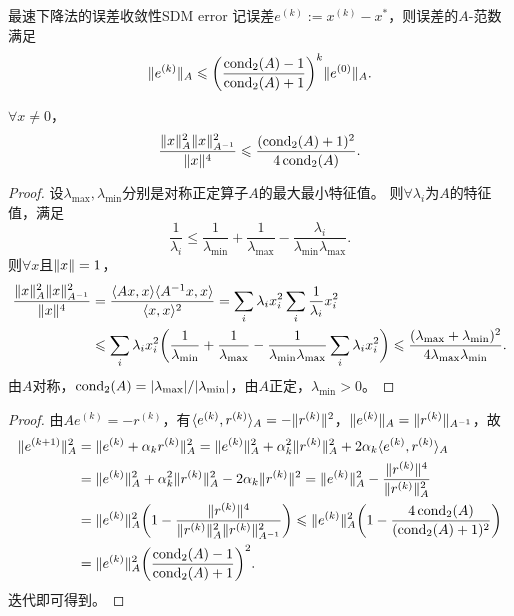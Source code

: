\begin{theorem}
    {最速下降法的误差收敛性}{SDM error}
    记误差$e^{(k)} := x^{(k)} - x^*$，则误差的$A$-范数满足
    \begin{equation}
        \label{eqn:SDM e^k}
        \lVert e^{(k)}\rVert_A \leqslant \biggl(\frac{\operatorname{cond}_2(A) - 1}{\operatorname{cond}_2(A) + 1}\biggr)^k\lVert e^{(0)}\rVert_A.
    \end{equation}
\end{theorem}

\begin{lemma}
    $\forall x \neq 0$，
    \begin{equation}
        \frac{\lVert x\rVert_A^2\lVert x\rVert_{A^{-1}}^2}{\lVert x\rVert^4} \leqslant \frac{(\operatorname{cond}_2(A) + 1)^2}{4\operatorname{cond}_2(A)}.
    \end{equation}
\end{lemma}

\begin{proof}
    设$\lambda_{\max},\lambda_{\min}$分别是对称正定算子$A$的最大最小特征值。
    则$\forall\lambda_i$为$A$的特征值，满足
    \[
        \frac1{\lambda_i} \leq \frac1{\lambda_{\min}} + \frac1{\lambda_{\max}} - \frac{\lambda_i}{\lambda_{\min}\lambda_{\max}}.
    \]
    则$\forall x$且$\lVert x\rVert = 1$，
    \begin{align*}
        \frac{\lVert x\rVert_A^2\lVert x\rVert_{A^{-1}}^2}{\lVert x\rVert^4} &= \frac{\langle Ax,x\rangle\langle A^{-1} x,x\rangle}{\langle x,x\rangle^2} = \sum_i\lambda_ix_i^2\sum_i\frac1{\lambda_i}x_i^2\\
        &\leqslant \sum_i\lambda_ix_i^2\biggl(\frac1{\lambda_{\min}} + \frac1{\lambda_{\max}} - \frac1{\lambda_{\min}\lambda_{\max}}\sum_i\lambda_ix_i^2\biggr) \leqslant \frac{(\lambda_{\max} + \lambda_{\min})^2}{4\lambda_{\max}\lambda_{\min}}.
    \end{align*}
    由$A$对称，$\operatorname{cond}_2(A) = \lvert\lambda_{\max}\rvert/\lvert\lambda_{\min}\rvert$，由$A$正定，$\lambda_{\min} > 0$。
\end{proof}

\begin{proof}
    由$Ae^{(k)} = -r^{(k)}$，有$\langle e^{(k)},r^{(k)}\rangle_A = -\lVert r^{(k)}\rVert^2$，$\lVert e^{(k)}\rVert_A = \lVert r^{(k)}\rVert_{A^{-1}}$，故
    \begin{align*}
        \lVert e^{(k+1)}\rVert_A^2 &= \lVert e^{(k)} + \alpha_kr^{(k)}\rVert_A^2
        = \lVert e^{(k)}\rVert_A^2 + \alpha_k^2\lVert r^{(k)}\rVert_A^2 + 2\alpha_k\langle e^{(k)},r^{(k)}\rangle_A\\
        &= \lVert e^{(k)}\rVert_A^2 + \alpha_k^2\lVert r^{(k)}\rVert_A^2 - 2\alpha_k\lVert r^{(k)}\rVert^2 =
        \lVert e^{(k)}\rVert_A^2 - \frac{\lVert r^{(k)}\rVert^4}{\lVert r^{(k)}\rVert_A^2}\\
        &= \lVert e^{(k)}\rVert_A^2\biggl(1 - \frac{\lVert r^{(k)}\rVert^4}{\lVert r^{(k)}\rVert_A^2\lVert r^{(k)}\rVert_{A^{-1}}^2}\biggr) \leqslant \lVert e^{(k)}\rVert_A^2\biggl(1 - \frac{4\operatorname{cond}_2(A)}{(\operatorname{cond}_2(A) + 1)^2}\biggr)\\
        &= \lVert e^{(k)}\rVert_A^2\biggl(\frac{\operatorname{cond}_2(A) - 1}{\operatorname{cond}_2(A) + 1}\biggr)^2.
    \end{align*}
    迭代即可得到。
\end{proof}

